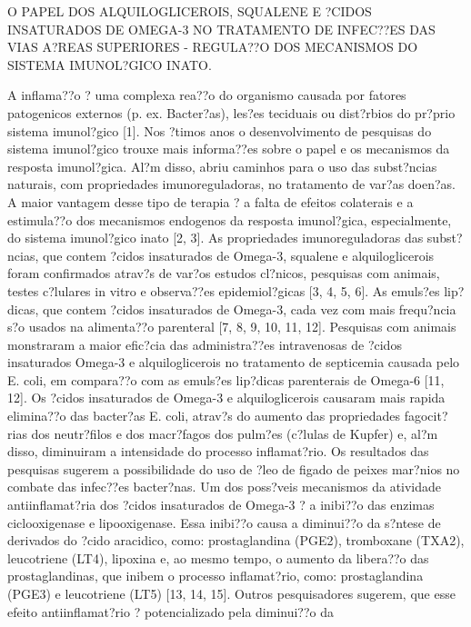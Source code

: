 \documentclass[12pt]{article}
\begin{document}
\begin{center}
\large{O PAPEL DOS ALQUILOGLICEROIS, SQUALENE E ?CIDOS INSATURADOS DE OMEGA-3
NO TRATAMENTO DE INFEC??ES DAS VIAS A?REAS SUPERIORES - REGULA??O DOS
MECANISMOS DO SISTEMA IMUNOL?GICO INATO.}
\end{center}

 A inflama??o ? uma complexa rea??o do organismo causada por fatores
patogenicos externos (p. ex. Bacter?as), les?es teciduais ou dist?rbios
do pr?prio sistema imunol?gico [1]. Nos ?timos anos o desenvolvimento de
pesquisas do sistema imunol?gico trouxe mais informa??es sobre o papel
e os mecanismos da resposta imunol?gica. Al?m disso, abriu caminhos
para o uso das subst?ncias naturais, com propriedades imunoreguladoras, no
tratamento de var?as doen?as. A maior vantagem desse tipo de terapia ?
a falta de efeitos colaterais e a estimula??o dos mecanismos endogenos
da resposta imunol?gica, especialmente, do sistema imunol?gico inato
[2, 3]. As propriedades imunoreguladoras das subst?ncias, que contem
?cidos insaturados de Omega-3, squalene e alquiloglicerois foram
confirmados atrav?s de var?os estudos cl?nicos, pesquisas com animais, testes
c?lulares in vitro e observa??es  epidemiol?gicas [3, 4, 5, 6].
 As emuls?es lip?dicas, que contem ?cidos insaturados de Omega-3, cada
vez com mais frequ?ncia s?o usados na alimenta??o parenteral [7, 8, 9,
10, 11, 12]. Pesquisas com animais monstraram a maior efic?cia das
administra??es intravenosas de ?cidos insaturados Omega-3 e
alquiloglicerois no tratamento de septicemia causada pelo E. coli, em compara??o com
as emuls?es lip?dicas parenterais de Omega-6 [11, 12]. Os ?cidos
insaturados de Omega-3 e alquiloglicerois causaram mais rapida elimina??o das
bacter?as E. coli, atrav?s do aumento das propriedades fagocit?rias dos
neutr?filos e dos macr?fagos dos pulm?es (c?lulas de Kupfer) e, al?m
disso, diminuiram a intensidade do processo inflamat?rio. Os resultados
das pesquisas sugerem a possibilidade do uso de ?leo de figado de peixes
mar?nios no combate das infec??es bacter?nas.
 Um dos poss?veis mecanismos da atividade antiinflamat?ria dos ?cidos
insaturados de Omega-3 ? a inibi??o das enzimas ciclooxigenase e
lipooxigenase. Essa inibi??o causa a diminui??o da s?ntese de derivados do
?cido aracidico, como: prostaglandina (PGE2), tromboxane (TXA2),
leucotriene (LT4), lipoxina e, ao mesmo tempo, o aumento da libera??o das
prostaglandinas, que inibem o processo inflamat?rio, como: prostaglandina
(PGE3) e leucotriene (LT5) [13, 14, 15]. Outros pesquisadores sugerem, que
esse efeito antiinflamat?rio ? potencializado pela diminui??o da
\end{document}
